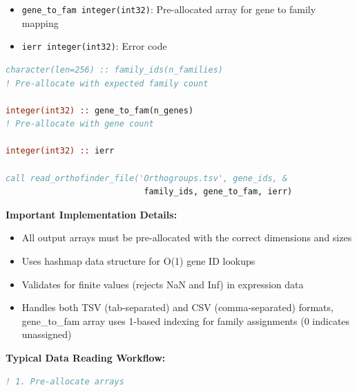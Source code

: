 \documentclass[11pt]{article}
\begin{document}
\begin{enumerate}
\begin{enumerate}
\begin{itemize}
\begin{itemize}
	      	      	      	\item \texttt{gene\_to\_fam integer(int32)}: Pre-allocated array
	      	      	      	      for gene to family mapping
	      	      	      	      
	      	      	      	\item \texttt{ierr integer(int32)}: Error code
	      	      	      \end{itemize}
	      	      	      \begin{lstlisting}[language=Fortran, caption={Read OrthoFinder Family Mapping}]
character(len=256) :: family_ids(n_families)  
! Pre-allocate with expected family count

integer(int32) :: gene_to_fam(n_genes)     
! Pre-allocate with gene count

integer(int32) :: ierr

call read_orthofinder_file('Orthogroups.tsv', gene_ids, &
                            family_ids, gene_to_fam, ierr)
	      	      	      \end{lstlisting}
	      	      	      
	      	      	      \textbf{Important Implementation Details:}
	      	      	      \begin{itemize}
	      	      	      	\item All output arrays must be pre-allocated with the correct dimensions
	      	      	      	      and sizes
	      	      	      	      
	      	      	      	\item Uses hashmap data structure for O(1) gene ID lookups
	      	      	      	      
	      	      	      	\item Validates for finite values (rejects NaN and Inf) in expression
	      	      	      	      data
	      	      	      	      
	      	      	      	\item Handles both TSV (tab-separated) and CSV (comma-separated)
	      	      	      	      formats, gene\_to\_fam array uses 1-based indexing for family
	      	      	      	      assignments (0 indicates unassigned)
	      	      	      \end{itemize}
	      	      	      
	      	      	      \textbf{Typical Data Reading Workflow:}
	      	      	      \begin{lstlisting}[language=Fortran, caption={Complete Data Reading Workflow}]
! 1. Pre-allocate arrays


\end{lstlisting}
\end{itemize}
\end{enumerate}
\end{enumerate}
\end{document}
